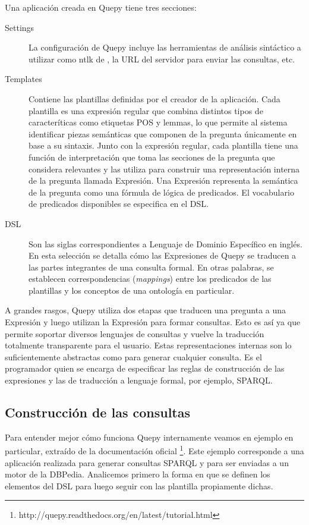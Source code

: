 Una aplicación creada en Quepy tiene tres secciones:
\begin{description}
    \item[Settings] La configuración de Quepy incluye las herramientas de análisis sintáctico a utilizar como ntlk de \citet{nltk}, la URL del servidor para enviar las consultas, etc.
    \item[Templates] Contiene las plantillas definidas por el creador de la aplicación. Cada plantilla es una expresión regular que combina distintos tipos de caracteríticas como etiquetas POS y lemmas, lo que permite al sistema identificar piezas semánticas que componen de la pregunta únicamente en base a su sintaxis. Junto con la expresión regular, cada plantilla tiene una función de interpretación que toma las secciones de la pregunta que considera relevantes y las utiliza para construir una representación interna de la pregunta llamada Expresión. Una Expresión representa la semántica de la pregunta como una fórmula de lógica de predicados. El vocabulario de predicados disponibles se especifica en el DSL.
    \item[DSL] Son las siglas correspondientes a Lenguaje de Dominio Específico en inglés. En esta selección se detalla cómo las Expresiones de Quepy se traducen a las partes integrantes de una consulta formal. En otras palabras, se establecen correspondencias (\textit{mappings}) entre los predicados de las plantillas y los conceptos de una ontología en particular.
\end{description}

A grandes rasgos, Quepy utiliza dos etapas que traducen una pregunta a una Expresión y luego utilizan la Expresión para formar consultas. Esto es así ya que permite soportar diversos lenguajes de consultas y vuelve la traducción totalmente transparente para el usuario. Estas representaciones internas son lo suficientemente abstractas como para generar cualquier consulta. Es el programador quien se encarga de especificar las reglas de construcción de las expresiones y las de traducción a lenguaje formal, por ejemplo, SPARQL.

\subsection{Construcción de las consultas}

Para entender mejor cómo funciona Quepy internamente veamos en ejemplo en particular, extraído de la documentación oficial \footnote{http://quepy.readthedocs.org/en/latest/tutorial.html}. Este ejemplo corresponde a una aplicación realizada para generar consultas SPARQL y para ser enviadas a un motor de la DBPedia. Analicemos primero la forma en que se definen los elementos del DSL para luego seguir con las plantilla propiamente dichas.

